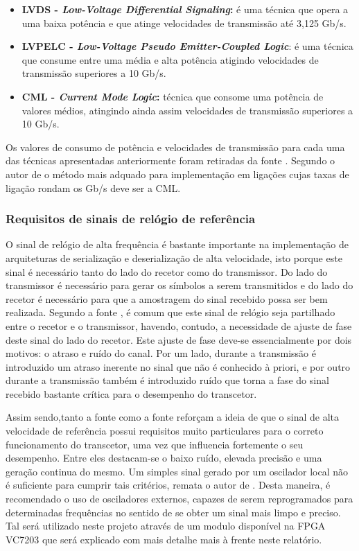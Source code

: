\begin{itemize}
	\item \textbf{LVDS - \textit{Low-Voltage Differential Signaling}:} é uma técnica que opera a uma baixa potência e que atinge velocidades de transmissão até 3,125 Gb/s. 
	\item \textbf{LVPELC - \textit{Low-Voltage Pseudo Emitter-Coupled Logic}}: é uma técnica que consume entre uma média e alta potência atigindo velocidades de transmissão superiores a 10 Gb/s.
	\item \textbf{CML - \textit{Current Mode Logic}:} técnica que consome uma potência de valores médios, atingindo ainda assim velocidades de transmissão superiores a 10 Gb/s.
\end{itemize}

Os valores de consumo de potência e velocidades de transmissão para cada uma das técnicas apresentadas anteriormente foram retiradas da fonte \cite{R036}. Segundo o autor de \cite{R032} o método mais adquado para implementação em ligações cujas taxas de ligação rondam os Gb/s deve ser a CML.

\subsubsection*{Requisitos de sinais de relógio de referência}

O sinal de relógio de alta frequência é bastante importante na implementação de arquiteturas de serialização e deserialização de alta velocidade, isto porque este sinal é necessário tanto do lado do recetor como do transmissor. Do lado do transmissor é necessário para gerar os símbolos a serem transmitidos e do lado do recetor é necessário para que a amostragem do sinal recebido possa ser bem realizada. Segundo a fonte \cite{R012}, é comum que este sinal de relógio seja partilhado entre o recetor e o transmissor, havendo, contudo, a necessidade de ajuste de fase deste sinal do lado do recetor. Este ajuste de fase deve-se essencialmente por dois motivos: o atraso e ruído do canal. Por um lado, durante a transmissão é introduzido um atraso inerente no sinal que não é conhecido à priori, e por outro durante a transmissão também é introduzido ruído que torna a fase do sinal recebido bastante crítica para o desempenho do transcetor. 

Assim sendo,tanto a fonte \cite{R032} como a fonte \cite{R012} reforçam a ideia de que o sinal de alta velocidade de referência possui requisitos muito particulares para o correto funcionamento do transcetor, uma vez que influencia fortemente o seu desempenho. Entre eles destacam-se o baixo ruído, elevada precisão e uma geração continua do mesmo. Um simples sinal gerado por um oscilador local não é suficiente para cumprir tais critérios, remata o autor de \cite{R012}. Desta maneira, é recomendado o uso de osciladores externos, capazes de serem reprogramados para determinadas frequências no sentido de se obter um sinal mais limpo e preciso. Tal será utilizado neste projeto através de um modulo disponível na FPGA VC7203 que será explicado com mais detalhe mais à frente neste relatório.


